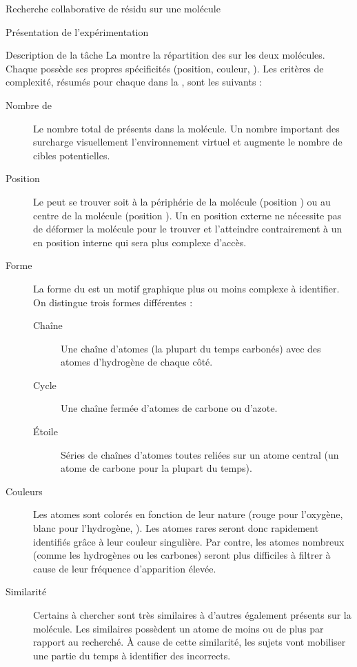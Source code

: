 \documentclass[myfrancais]{mythesis}
\begin{document}
\begin{mychapter}{Recherche collaborative de résidu sur une molécule}
\begin{mysection}{Présentation de l'expérimentation}
\begin{mysubsection}{Description de la tâche}
				La  montre la répartition des  sur les deux molécules.
				Chaque  possède ses propres spécificités (position, couleur, \myetc).
				Les critères de complexité, résumés pour chaque  dans la , sont les suivants :
				\begin{description}
					\item[Nombre de ] Le nombre total de  présents dans la molécule.
						Un nombre important des  surcharge visuellement l'environnement virtuel et augmente le nombre de cibles potentielles.
					\item[Position] Le  peut se trouver soit à la périphérie de la molécule (position ) ou au centre de la molécule (position ).
						Un  en position externe ne nécessite pas de déformer la molécule pour le trouver et l'atteindre contrairement à un  en position interne qui sera plus complexe d'accès.
					\item[Forme] La forme du  est un motif graphique plus ou moins complexe à identifier.
						On distingue trois formes différentes :
						\begin{description}
							\item[Chaîne] Une chaîne d'atomes (la plupart du temps carbonés) avec des atomes d'hydrogène de chaque côté.
							\item[Cycle] Une chaîne fermée d'atomes de carbone ou d'azote.
							\item[Étoile] Séries de chaînes d'atomes toutes reliées sur un atome central (un atome de carbone pour la plupart du temps).
						\end{description}
					\item[Couleurs] Les atomes sont colorés en fonction de leur nature (rouge pour l'oxygène, blanc pour l'hydrogène, \myetc).
						Les atomes rares seront donc rapidement identifiés grâce à leur couleur singulière.
						Par contre, les atomes nombreux (comme les hydrogènes ou les carbones) seront plus difficiles à filtrer à cause de leur fréquence d'apparition élevée.
					\item[Similarité] Certains  à chercher sont très similaires à d'autres  également présents sur la molécule.
						Les  similaires possèdent un atome de moins ou de plus par rapport au  recherché.
						À cause de cette similarité, les sujets vont mobiliser une partie du temps à identifier des  incorrects.
				\end{description}


\end{mysubsection}
\end{mysection}
\end{mychapter}
\end{document}

